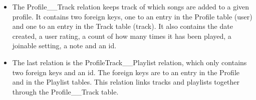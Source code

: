 \begin{itemize}
\item The Profile\_\_Track relation keeps track of which songs are added to a given profile. It contains two foreign keys, one to an entry in the Profile table (user) and one to an entry in the Track table (track). It also contains the date created, a user rating, a count of how many times it has been played, a joinable setting, a note and an id. 

\item The last relation is the ProfileTrack\_\_Playlist relation, which only contains two foreign keys and an id. The foreign keys are to an entry in the Profile and in the Playlist tables. This relation links tracks and playlists together through the Profile\_\_Track table.
\end{itemize}